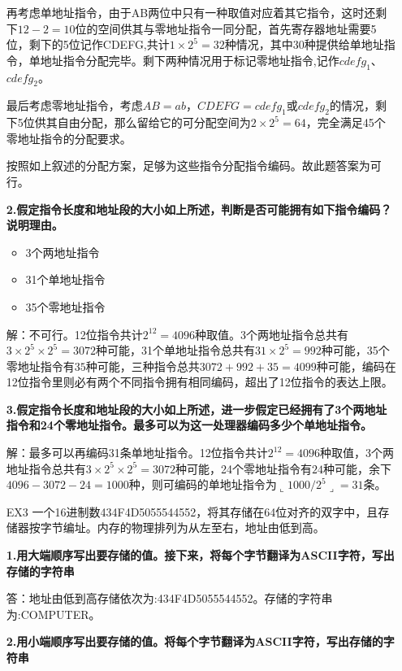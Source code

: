 \documentclass[12pt,a4paper,utf8]{ctexart}
\begin{document}
\begin{enumerate}
再考虑单地址指令，由于AB两位中只有一种取值对应着其它指令，这时还剩下$ 12 - 2= 10 $位的空间供其与零地址指令一同分配，首先寄存器地址需要5位，剩下的5位记作CDEFG,共计$ 1\times 2^5 = 32 $种情况，其中30种提供给单地址指令，单地址指令分配完毕。剩下两种情况用于标记零地址指令,记作$cdefg_1$、$ cdefg_2 $。

最后考虑零地址指令，考虑$ AB = ab $，$ CDEFG = cdefg_1 $或$ cdefg_2 $的情况，剩下5位供其自由分配，那么留给它的可分配空间为$ 2 \times 2^5 = 64$，完全满足45个零地址指令的分配要求。

按照如上叙述的分配方案，足够为这些指令分配指令编码。故此题答案为可行。

\textbf{2.假定指令长度和地址段的大小如上所述，判断是否可能拥有如下指令编码？说明理由。}

\begin{itemize}
	\item 3个两地址指令
	\item 31个单地址指令
	\item 35个零地址指令
\end{itemize}

解：不可行。12位指令共计$ 2^{12} = 4096$种取值。3个两地址指令总共有$ 3 \times 2^5 \times 2^5  = 3072$种可能，31个单地址指令总共有$ 31 \times 2^5 = 992 $种可能，35个零地址指令有$ 35 $种可能，三种指令总共$ 3072 + 992 + 35 = 4099 $种可能，编码在12位指令里则必有两个不同指令拥有相同编码，超出了12位指令的表达上限。

\textbf{3.假定指令长度和地址段的大小如上所述，进一步假定已经拥有了3个两地址指令和24个零地址指令。最多可以为这一处理器编码多少个单地址指令。}

解：最多可以再编码31条单地址指令。12位指令共计$ 2^{12} = 4096$种取值，3个两地址指令总共有$ 3 \times 2^5 \times 2^5  = 3072$种可能，24个零地址指令有$ 24 $种可能，余下$ 4096 - 3072 - 24 = 1000 $种，则可编码的单地址指令为$ \llcorner 1000 / 2^5 \lrcorner = 31 $条。

\item[EX3] %
一个16进制数434F4D5055544552，将其存储在64位对齐的双字中，且存储器按字节编址。内存的物理排列为从左至右，地址由低到高。

\textbf{1.用大端顺序写出要存储的值。接下来，将每个字节翻译为ASCII字符，写出存储的字符串}

答：地址由低到高存储依次为:434F4D5055544552。存储的字符串为:COMPUTER。

\textbf{2.用小端顺序写出要存储的值。将每个字节翻译为ASCII字符，写出存储的字符串}


\end{enumerate}
\end{document}
